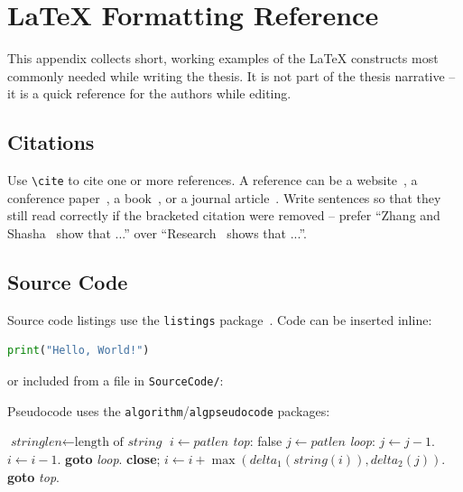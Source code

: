 \chapter{LaTeX Formatting Reference}
\label{Appendix2}

This appendix collects short, working examples of the LaTeX constructs most
commonly needed while writing the thesis. It is not part of the thesis
narrative -- it is a quick reference for the authors while editing.

\section{Citations}

Use \verb|\cite| to cite one or more references. A reference can be a
website~\cite{Listings,HDLVThS}, a conference paper~\cite{1994-Cavnar}, a
book~\cite{1984-TeX-Knuth,2006-DDien,2006-NPTV}, or a journal
article~\cite{1989-TED}. Write sentences so that they still read correctly
if the bracketed citation were removed -- prefer ``Zhang and
Shasha~\cite{1989-TED} show that ...'' over ``Research~\cite{1989-TED} shows
that ...''.

\section{Source Code}

Source code listings use the \verb|listings| package~\cite{Listings}. Code
can be inserted inline:

\begin{lstlisting}[language=Python]
print("Hello, World!")
\end{lstlisting}

or included from a file in \verb|SourceCode/|:



Pseudocode uses the \verb|algorithm|/\verb|algpseudocode| packages:

\begin{algorithm}
\caption{Example algorithm}\label{euclid}
\begin{algorithmic}[1]
\State $\textit{stringlen} \gets \text{length of }\textit{string}$
\State $i \gets \textit{patlen}$
\BState \emph{top}:
 \Return false
\EndIf
\State $j \gets \textit{patlen}$
\BState \emph{loop}:
\State $j \gets j-1$.
\State $i \gets i-1$.
\State \textbf{goto} \emph{loop}.
\State \textbf{close};
\EndIf
\State $i \gets i+\max(\textit{delta}_1(\textit{string}(i)),\textit{delta}_2(j))$.
\State \textbf{goto} \emph{top}.
\EndProcedure
\end{algorithmic}
\end{algorithm}

